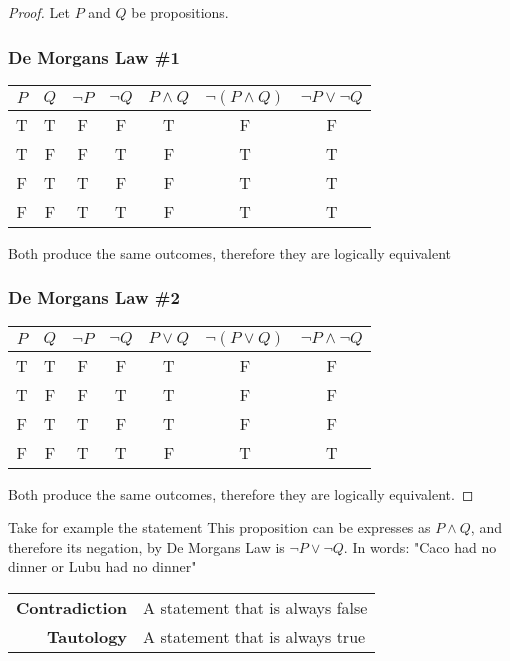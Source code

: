 \documentclass[../notes.tex]{subfiles}
\begin{document}
\begin{proof}
	Let $P$ and $Q$ be propositions.

	\subsubsection*{De Morgans Law \#1}
  
	\begin{center}
	  \begin{tabular}{c c || c c c || c c }
	  	$P$ & $Q$ & $\lnot P$ & $\lnot Q$ & $P \land Q$ & $\lnot (P \land Q)$ & $\lnot P \lor \lnot Q$ \\\hline
	  	T & T & F & F & T & F & F \\
	  	T & F & F & T & F & T & T \\
	  	F & T & T & F & F & T & T \\
	  	F & F & T & T & F & T & T \\
	  \end{tabular}
	\end{center}
	Both produce the same outcomes, therefore they are logically equivalent

	\subsubsection*{De Morgans Law \#2}

	\begin{center}
	  \begin{tabular}{c c || c c c || c c }
	  	$P$ & $Q$ & $\lnot P$ & $\lnot Q$ & $P \lor Q$ & $\lnot (P \lor Q)$ & $\lnot P \land \lnot Q$ \\\hline
	  	T & T & F & F & T & F & F \\
	  	T & F & F & T & T & F & F \\
	  	F & T & T & F & T & F & F \\
	  	F & F & T & T & F & T & T \\
	  \end{tabular}
	\end{center}
	Both produce the same outcomes, therefore they are logically equivalent.
\end{proof}
Take for example the statement  This proposition can be expresses as $P \land Q$, and therefore its negation, by De Morgans Law is $\lnot P \lor \lnot Q$. In words: "Caco had no dinner or Lubu had no dinner"

\begin{definition}
	\hfill
	\begin{center}
	  \begin{tabular}{r l}
	  	\textbf{Contradiction} & A statement that is always false \\
	  	\textbf{Tautology} & A statement that is always true 
	  \end{tabular}
	\end{center}
\end{definition}
\end{document}
